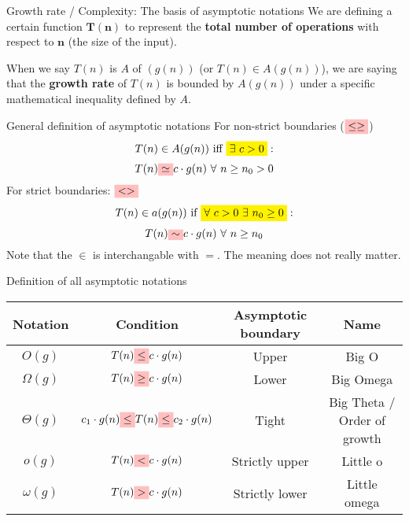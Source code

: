 \begin{theorem}
    {Growth rate / Complexity: The basis of asymptotic notations}
    We are defining a certain function $\mathbf{T(n)}$ to represent the \textbf{total number of operations} with respect to $\mathbf{n}$ (the size of the input).

    When we say $T(n)$ is $A$ of $(g(n))$ (or $T(n)\in A(g(n))$), we are saying that the \textbf{growth rate} of $T(n)$ is bounded by $A(g(n))$ under a specific mathematical inequality defined by $A$.
\end{theorem}

\begin{definition}
    {General definition of asymptotic notations}
    For non-strict boundaries ($\mathcolorbox{pink}{\leq \geq}$)
    \[T(n) \in A(g(n))\ \text{iff}\ \mathcolorbox{yellow}{\exists\ c > 0}:\]
    \[T(n) \mathcolorbox{pink}{\simeq} c\cdot g(n)\ \forall\ n \geq n_0 > 0\]
    For strict boundaries: {$\mathcolorbox{pink}{< >}$}
    \[T(n) \in a(g(n))\ \text{if}\ \mathcolorbox{yellow}{\forall\ c > 0\ \exists\ n_0 \geq 0}:\]
    \[T(n) \mathcolorbox{pink}{\sim} c\cdot g(n)\ \forall\ n \geq n_0\]
    Note that the $\in$ is interchangable with $=$. The meaning does not really matter.
\end{definition}

\begin{definition}
    {Definition of all asymptotic notations}
    \begin{tabular}{|c|c|c|c|}
        \hline
        \textbf{Notation} & \textbf{Condition}                                                                     & \textbf{Asymptotic boundary} & \textbf{Name}               \\ \hline
        $O(g)$            & $T(n) \mathcolorbox{pink}{\leq} c\cdot g(n)$                                           & Upper                        & Big O                       \\
        $\Omega(g)$       & $T(n) \mathcolorbox{pink}{\geq} c\cdot g(n)$                                           & Lower                        & Big Omega                   \\
        $\Theta(g)$       & $ c_1\cdot g(n)\mathcolorbox{pink}{\leq} T(n) \mathcolorbox{pink}{\leq} c_2\cdot g(n)$ & Tight                        & Big Theta / Order of growth \\
        $o(g)$            & $T(n) \mathcolorbox{pink}{<} c\cdot g(n)$                                              & Strictly upper               & Little o                    \\
        $\omega(g)$       & $T(n) \mathcolorbox{pink}{>} c\cdot g(n)$                                              & Strictly lower               & Little omega                \\ \hline
    \end{tabular}
\end{definition}

